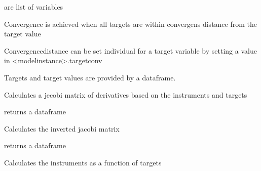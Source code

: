 \documentclass[letterpaper,10pt,english]{sphinxmanual}
\begin{document}
\begin{fulllineitems}
\sphinxAtStartPar
{} are list of variables

\sphinxAtStartPar
Convergence is achieved when all targets are within convergens distance from the target value

\sphinxAtStartPar
Convergencedistance can be set individual for a target variable by setting a value in \textless{}modelinstance\textgreater{}.targetconv

\sphinxAtStartPar
Targets and target values are provided by a dataframe.

\begin{fulllineitems}
\label{\detokenize{index:modelinvert.targets_instruments.jacobi}}
\pysigstartsignatures
{}
\pysigstopsignatures
\sphinxAtStartPar
Calculates a jecobi matrix of derivatives based on the instruments and targets

\sphinxAtStartPar
returns a dataframe

\end{fulllineitems}


\begin{fulllineitems}
\label{\detokenize{index:modelinvert.targets_instruments.invjacobi}}
\pysigstartsignatures
{}
\pysigstopsignatures
\sphinxAtStartPar
Calculates the inverted jacobi matrix

\sphinxAtStartPar
returns a dataframe

\end{fulllineitems}


\begin{fulllineitems}
\label{\detokenize{index:modelinvert.targets_instruments.targetseek}}
\pysigstartsignatures
{}
\pysigstopsignatures
\sphinxAtStartPar
Calculates the instruments as a function of targets

\end{fulllineitems}


\end{fulllineitems}
\end{document}
